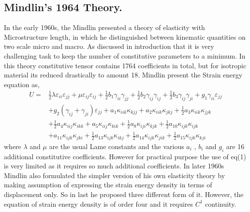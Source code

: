 \documentclass[12pt]{article}
\begin{document}
\subsection{Mindlin's 1964 Theory.}
In the early 1960s, the Mindlin presented a theory of elasticity with Microstructure length, in which he distinguished between kinematic quantities on two scale micro and macro. As discussed in introduction that it is very challenging task to keep the number of constitutive parameters to a minimum. In this theory constitutive tensor contains 1764 coefficients in total, but for isotropic material its reduced drastically to amount 18. Mindlin present the Strain energy equation as,
\begin{equation}\label{first}
\begin{aligned}
U= &\frac{1}{2}\lambda\varepsilon_{ii}\varepsilon_{jj}+\mu\varepsilon_{ij}\varepsilon_{ij}+\frac{1}{2}b_1 \gamma_{ii} \gamma_{jj}+\frac{1}{2}b_2 \gamma_{ij} \gamma_{ij}+\frac{1}{2}b_3 \gamma_{ij} \gamma_{ji}+g_1\gamma_{ii}\varepsilon_{jj}
\\   
&+g_2(\gamma_{ij}+\gamma_{ji})\varepsilon_{jj}+a_1\kappa_{iik}\kappa_{kjj}+a_2\kappa_{iik}\kappa_{jkj}+\frac{1}{2}a_3\kappa_{iik}\kappa_{jjk}
\\
&+\frac{1}{2}a_4\kappa_{iij}\kappa_{ikk}
 +a_5\kappa_{iij}\kappa_{kik}
+\frac{1}{2}a_8\kappa_{iji}\kappa_{kjk}+\frac{1}{2}a_{10}\kappa_{ijk}\kappa_{ijk}
\\
&+a_{11}\kappa_{ijk}\kappa_{jki}+\frac{1}{2}a_{13}\kappa_{ijk}\kappa_{ikj}
+\frac{1}{2}a_{14}\kappa_{ijk}\kappa_{jik}
+\frac{1}{2}a_{15}\kappa_{ijk}\kappa_{kji}
\end{aligned}
\end{equation}  
\newline
where $\lambda$ and $\mu$ are the usual Lame constants and the various $a_i$ , $b_i$ and $g_i$ are 16 additional constitutive coefficients. However for practical purpose the use of eq(1) is very limited as it requires so much additional coefficients. In later 1960s Mindlin also formulated the simpler version of his own elasticity theory by making assumption of expressing the strain energy density in terms of displacement only. So in last he proposed three different form of it. However, the equation of strain energy density is of order four and it requires $C^{1}$ continuity.
\newpage
\end{document}
